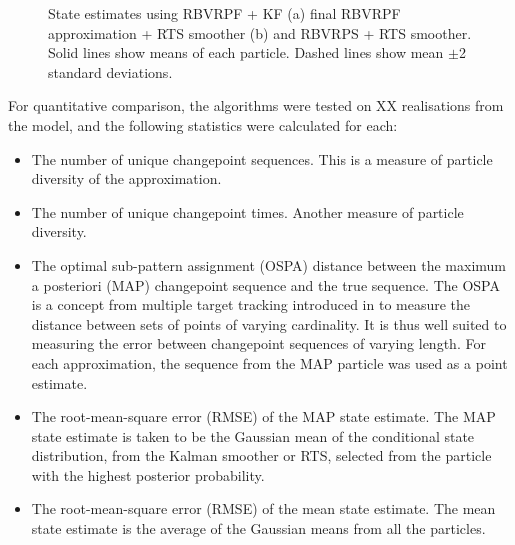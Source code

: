 \documentclass[journal]{IEEEtran}
\begin{document}
\begin{figure}[!t]
\caption{State estimates using RBVRPF + KF (a) final RBVRPF approximation + RTS smoother (b) and RBVRPS + RTS smoother. Solid lines show means of each particle. Dashed lines show mean $\pm$2 standard deviations.}
\label{fig:example_state}
\end{figure}

For quantitative comparison, the algorithms were tested on XX realisations from the model, and the following statistics were calculated for each:
\begin{itemize}
	\item The number of unique changepoint sequences. This is a measure of particle diversity of the approximation.
	\item The number of unique changepoint times. Another measure of particle diversity.
	\item The optimal sub-pattern assignment (OSPA) distance between the maximum a posteriori (MAP) changepoint sequence and the true sequence. The OSPA is a concept from multiple target tracking introduced in \cite{Schuhmacher2008} to measure the distance between sets of points of varying cardinality. It is thus well suited to measuring the error between changepoint sequences of varying length. For each approximation, the sequence from the MAP particle was used as a point estimate.
	\item The root-mean-square error (RMSE) of the MAP state estimate. The MAP state estimate is taken to be the Gaussian mean of the conditional state distribution, from the Kalman smoother or RTS, selected from the particle with the highest posterior probability.
	\item The root-mean-square error (RMSE) of the mean state estimate. The mean state estimate is the average of the Gaussian means from all the particles.
\end{itemize}
\end{document}
